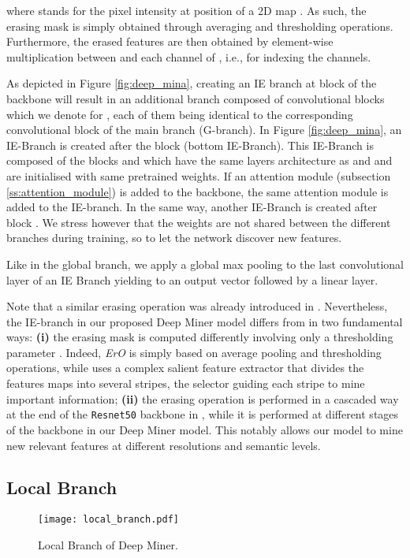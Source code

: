 \documentclass[final]{cvpr}
\begin{document}
where  stands for the pixel intensity at position  of a 2D map . As such, the erasing mask  is simply obtained through averaging and thresholding operations. Furthermore, the erased features  are then obtained by element-wise multiplication between  and each channel of , i.e.,  for  indexing the channels.

As depicted in Figure \ref{fig:deep_mina}, creating an IE branch  at block  of the backbone will result in an additional branch composed of  convolutional blocks which we denote  for , each of them being identical to the corresponding convolutional block of the main branch (G-branch).  In Figure \ref{fig:deep_mina},  an IE-Branch  is created after the block  (bottom IE-Branch). This IE-Branch is composed of the blocks  and  which have the same layers architecture as  and  and are initialised with same pretrained weights. If an attention module (subsection \ref{ss:attention_module}) is added to the backbone, the same attention module is added to the IE-branch. In the same way, another IE-Branch is created after block  . We stress however that the weights are not shared between the different branches during training, so to let the network discover new features. 

Like in the global branch, we apply a global max pooling to the last convolutional layer of an IE Branch  yielding to an output vector  followed by a linear layer. 

Note that a similar erasing operation was already introduced in \cite{chen2020salience}. Nevertheless, the IE-branch in our proposed Deep Miner model differs from \cite{chen2020salience} in two fundamental ways: \textbf{(i)} the erasing mask is computed differently involving only a thresholding parameter . Indeed, \textit{ErO} is simply based on average pooling and thresholding operations, while \cite{chen2020salience} uses a complex salient feature extractor that divides the features maps into several stripes,  the selector guiding each stripe to mine important information; \textbf{(ii)} the erasing operation is performed in a cascaded way at the end of the \texttt{Resnet50} backbone in \cite{chen2020salience} , while it is performed at different stages of the backbone in our Deep Miner model. This notably allows our model to mine new relevant features at different resolutions and semantic levels. 

\subsection{Local Branch}
\begin{figure}[t!]
  \centering
  \texttt{[image: local\_branch.pdf]}
\caption{Local Branch of Deep Miner.}
\label{fig:local_branch}
\end{figure}
\end{document}
